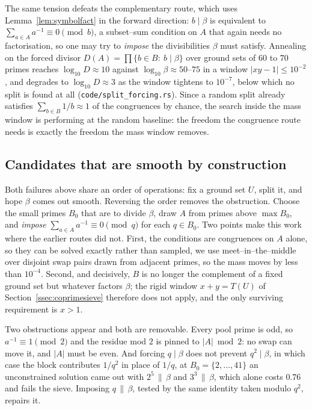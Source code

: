 \documentclass[11pt]{article}
\theoremstyle{definition}
\begin{document}
The same tension defeats the complementary route, which uses Lemma~\ref{lem:symbolfact} in the
forward direction: $b\mid\beta$ is equivalent to $\sum_{a\in A}a^{-1}\equiv0\pmod b$, a subset--sum
condition on $A$ that again needs no factorisation, so one may try to \emph{impose} the divisibilities
$\beta$ must satisfy. Annealing on the forced divisor $D(A)=\prod\{b\in B:\ b\mid\beta\}$ over ground
sets of $60$ to $70$ primes reaches $\log_{10}D\approx10$ against $\log_{10}\beta\approx50$--$75$ in a
window $|xy-1|\le10^{-2}$, and degrades to $\log_{10}D\approx3$ as the window tightens to $10^{-7}$,
below which no split is found at all \textup{(\texttt{code/split\_forcing.rs})}. Since a random split
already satisfies $\sum_{b\in B}1/b\approx1$ of the congruences by chance, the search inside the mass
window is performing at the random baseline: the freedom the congruence route needs is exactly the
freedom the mass window removes.

\subsection{Candidates that are smooth by construction}\label{ssec:smoothbuilt}

Both failures above share an order of operations: fix a ground set $U$, split it, and hope $\beta$
comes out smooth. Reversing the order removes the obstruction. Choose the small primes $B_0$ that
are to divide $\beta$, draw $A$ from primes above $\max B_0$, and \emph{impose}
$\sum_{a\in A}a^{-1}\equiv0\pmod q$ for each $q\in B_0$. Two points make this work where the earlier
routes did not. First, the conditions are congruences on $A$ alone, so they can be solved exactly
rather than sampled, we use meet--in--the--middle over disjoint swap pairs drawn from adjacent
primes, so the mass moves by less than $10^{-4}$. Second, and decisively, $B$ is no longer the
complement of a fixed ground set but whatever factors $\beta$; the rigid window $x+y=T(U)$ of
Section~\ref{ssec:coprimesieve} therefore does not apply, and the only surviving requirement is
$x>1$.

Two obstructions appear and both are removable. Every pool prime is odd, so $a^{-1}\equiv1\pmod2$ and
the residue mod $2$ is pinned to $|A|\bmod2$: no swap can move it, and $|A|$ must be even. And
forcing $q\mid\beta$ does not prevent $q^2\mid\beta$, in which case the block contributes $1/q^2$ in
place of $1/q$, at $B_0=\{2,\dots,41\}$ an unconstrained solution came out with $2^5\,\|\,\beta$ and
$3^3\,\|\,\beta$, which alone costs $0.76$ and fails the sieve. Imposing $q\,\|\,\beta$, tested by the
same identity taken modulo $q^2$, repairs it.
\end{document}
